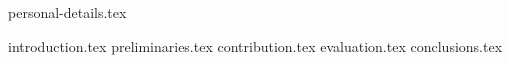 



	{personal-details.tex}
	\maketitle

	\begin{abstract}
		{abstract.tex}
	\end{abstract}

	{introduction.tex}
	{preliminaries.tex}
	{contribution.tex}
	{evaluation.tex}
	{conclusions.tex}

	
	
